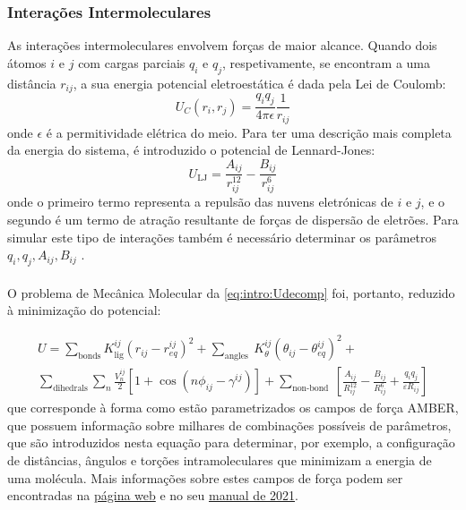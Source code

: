 \documentclass[12pt,a4paper]{article}
\begin{document}
\subsubsection{Interações Intermoleculares}
	As interações intermoleculares envolvem forças de maior alcance. Quando dois átomos $i$ e $j$ com cargas parciais $q_i$ e $q_j$, respetivamente, se encontram a uma distância $r_{ij}$, a sua energia potencial eletroestática é dada pela Lei de Coulomb:
	\begin{equation}
		U_C\left(r_i,r_j\right) = \dfrac{q_iq_j}{4\pi\epsilon}\dfrac{1}{r_{ij}}
	\end{equation}
	onde $\epsilon$ é a permitividade elétrica do meio. Para ter uma descrição mais completa da energia do sistema, é introduzido o potencial de Lennard-Jones:
	\begin{equation}
		U_{\text {LJ}}=\frac{A_{i j}}{r_{i j}^{12}}-\frac{B_{i j}}{r_{i j}^{6}}
	\end{equation}
	onde o primeiro termo representa a repulsão das nuvens eletrónicas de $i$ e $j$, e o segundo é um termo de atração resultante de forças de dispersão de eletrões. Para simular este tipo de interações também é necessário determinar os parâmetros $q_i,q_j,A_{ij},B_{ij}$ \cite{cornellSecondGenerationForce1995}.\paragraph{}
	
	O problema de Mecânica Molecular da \cref{eq:intro:Udecomp} foi, portanto, reduzido à minimização do potencial:
	
	\begin{equation}
		\begin{gathered}
			U=\sum_{\textrm{bonds}} K_{\textrm{lig}}^{ij}\left(r_{ij}-r_{e q}^{ij}\right)^{2}+\sum_{\text {angles }} K_{\theta}^{ij}\left(\theta_{ij}-\theta_{e q}^{ij}\right)^{2}+\\
			\sum_{\text {dihedrals}} \sum_{n} \frac{V_{n}^{ij}}{2}[1+\cos (n \phi_{ij}-\gamma^{ij})]+\sum_{\text {non-bond }}\left[\frac{A_{i j}}{R_{i j}^{12}}-\frac{B_{i j}}{R_{i j}^{6}}+\frac{q_{i} q_{j}}{\varepsilon R_{i j}}\right]
		\end{gathered}
	\end{equation}
	que corresponde à forma como estão parametrizados os campos de força AMBER, que possuem informação sobre milhares de combinações possíveis de parâmetros, que são introduzidos nesta equação para determinar, por exemplo, a configuração de distâncias, ângulos e torções intramoleculares que minimizam a energia de uma molécula. Mais informações sobre estes campos de força podem ser encontradas na \href{https://ambermd.org/AmberModels.php}{página web} e no seu \href{https://ambermd.org/doc12/Amber21.pdf#page=264}{manual de 2021}.
	
\end{document}

